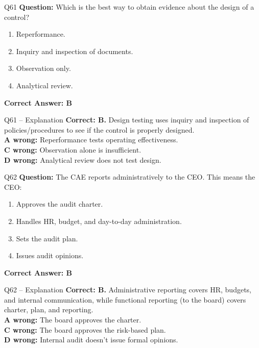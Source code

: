 \documentclass[aspectratio=169,10pt]{beamer}
\begin{document}
	\begin{frame}[t]{Q61}
		\small
		\textbf{Question:} Which is the best way to obtain evidence about the design of a control?
		\begin{enumerate}[label=\Alph*.,itemsep=1pt,topsep=2pt]
			\item Reperformance.
			\item Inquiry and inspection of documents.
			\item Observation only.
			\item Analytical review.
		\end{enumerate}
		\vspace{4pt}
		\textbf{Correct Answer: B}
	\end{frame}
	
	\begin{frame}[t]{Q61 -- Explanation}
		\small
		\textbf{Correct: B.} Design testing uses inquiry and inspection of policies/procedures to see if the control is properly designed. \\[4pt]
		\textbf{A wrong:} Reperformance tests operating effectiveness. \\[2pt]
		\textbf{C wrong:} Observation alone is insufficient. \\[2pt]
		\textbf{D wrong:} Analytical review does not test design.
	\end{frame}
	
	\begin{frame}[t]{Q62}
		\small
		\textbf{Question:} The CAE reports administratively to the CEO. This means the CEO:
		\begin{enumerate}[label=\Alph*.,itemsep=1pt,topsep=2pt]
			\item Approves the audit charter.
			\item Handles HR, budget, and day-to-day administration.
			\item Sets the audit plan.
			\item Issues audit opinions.
		\end{enumerate}
		\vspace{4pt}
		\textbf{Correct Answer: B}
	\end{frame}
	
	\begin{frame}[t]{Q62 -- Explanation}
		\small
		\textbf{Correct: B.} Administrative reporting covers HR, budgets, and internal communication, while functional reporting (to the board) covers charter, plan, and reporting. \\[4pt]
		\textbf{A wrong:} The board approves the charter. \\[2pt]
		\textbf{C wrong:} The board approves the risk-based plan. \\[2pt]
		\textbf{D wrong:} Internal audit doesn't issue formal opinions.
	\end{frame}
	
\end{document}
